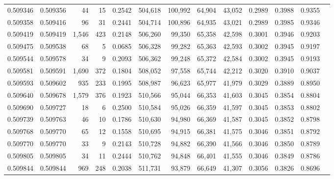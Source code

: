 \begin{tabular}{rrrrrrrrrrrrr}
0.509346 & 0.509356 &    44 &    15 &                                     0.2542 & 504,618 & 100,992 &  64,904 &  43,052 & 0.2989 & 0.3988 & 0.9355 \\
0.509358 & 0.509416 &    96 &    31 &                                     0.2441 & 504,714 & 100,896 &  64,935 &  43,021 & 0.2989 & 0.3985 & 0.9346 \\
0.509419 & 0.509419 & 1,546 &   423 &                                     0.2148 & 506,260 &  99,350 &  65,358 &  42,598 & 0.3001 & 0.3946 & 0.9203 \\
0.509475 & 0.509538 &    68 &     5 &                                     0.0685 & 506,328 &  99,282 &  65,363 &  42,593 & 0.3002 & 0.3945 & 0.9197 \\
0.509544 & 0.509578 &    34 &     9 &                                     0.2093 & 506,362 &  99,248 &  65,372 &  42,584 & 0.3002 & 0.3945 & 0.9193 \\
0.509581 & 0.509591 & 1,690 &   372 &                                     0.1804 & 508,052 &  97,558 &  65,744 &  42,212 & 0.3020 & 0.3910 & 0.9037 \\
0.509593 & 0.509602 &   935 &   233 &                                     0.1995 & 508,987 &  96,623 &  65,977 &  41,979 & 0.3029 & 0.3889 & 0.8950 \\
0.509640 & 0.509678 & 1,579 &   376 &                                     0.1923 & 510,566 &  95,044 &  66,353 &  41,603 & 0.3045 & 0.3854 & 0.8804 \\
0.509690 & 0.509727 &    18 &     6 &                                     0.2500 & 510,584 &  95,026 &  66,359 &  41,597 & 0.3045 & 0.3853 & 0.8802 \\
0.509739 & 0.509763 &    46 &    10 &                                     0.1786 & 510,630 &  94,980 &  66,369 &  41,587 & 0.3045 & 0.3852 & 0.8798 \\
0.509768 & 0.509770 &    65 &    12 &                                     0.1558 & 510,695 &  94,915 &  66,381 &  41,575 & 0.3046 & 0.3851 & 0.8792 \\
0.509770 & 0.509770 &    33 &     9 &                                     0.2143 & 510,728 &  94,882 &  66,390 &  41,566 & 0.3046 & 0.3850 & 0.8789 \\
0.509805 & 0.509805 &    34 &    11 &                                     0.2444 & 510,762 &  94,848 &  66,401 &  41,555 & 0.3046 & 0.3849 & 0.8786 \\
0.509844 & 0.509844 &   969 &   248 &                                     0.2038 & 511,731 &  93,879 &  66,649 &  41,307 & 0.3056 & 0.3826 & 0.8696 \\

\end{tabular}
